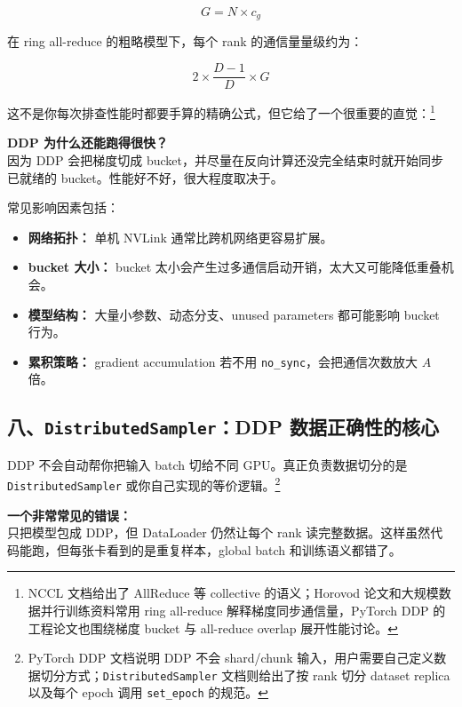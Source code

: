 \[
G = N \times c_g
\]

在 ring all-reduce 的粗略模型下，每个 rank 的通信量量级约为：

\[
2 \times \frac{D - 1}{D} \times G
\]

这不是你每次排查性能时都要手算的精确公式，但它给了一个很重要的直觉：\footnote{NCCL 文档给出了 AllReduce 等 collective 的语义；Horovod 论文和大规模数据并行训练资料常用 ring all-reduce 解释梯度同步通信量，PyTorch DDP 的工程论文也围绕梯度 bucket 与 all-reduce overlap 展开性能讨论。}

\begin{intubox}
\textbf{DDP 为什么还能跑得很快？}\\
因为 DDP 会把梯度切成 bucket，并尽量在反向计算还没完全结束时就开始同步已就绪的 bucket。性能好不好，很大程度取决于。
\end{intubox}

常见影响因素包括：

\begin{itemize}[leftmargin=1.5em]
  \item \textbf{网络拓扑：} 单机 NVLink 通常比跨机网络更容易扩展。
  \item \textbf{bucket 大小：} bucket 太小会产生过多通信启动开销，太大又可能降低重叠机会。
  \item \textbf{模型结构：} 大量小参数、动态分支、unused parameters 都可能影响 bucket 行为。
  \item \textbf{累积策略：} gradient accumulation 若不用 \texttt{no\_sync}，会把通信次数放大 $A$ 倍。
\end{itemize}

\subsection{八、\texttt{DistributedSampler}：DDP 数据正确性的核心}

DDP 不会自动帮你把输入 batch 切给不同 GPU。真正负责数据切分的是 \texttt{DistributedSampler} 或你自己实现的等价逻辑。\footnote{PyTorch DDP 文档说明 DDP 不会 shard/chunk 输入，用户需要自己定义数据切分方式；\texttt{DistributedSampler} 文档则给出了按 rank 切分 dataset replica 以及每个 epoch 调用 \texttt{set\_epoch} 的规范。}

\begin{warnbox}
\textbf{一个非常常见的错误：}\\
只把模型包成 DDP，但 DataLoader 仍然让每个 rank 读完整数据。这样虽然代码能跑，但每张卡看到的是重复样本，global batch 和训练语义都错了。
\end{warnbox}

